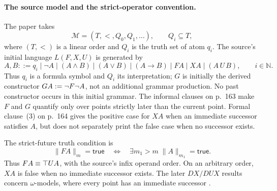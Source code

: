\paragraph{The source model and the strict-operator convention.}
The paper takes
\[
 \mathcal M=(T,<,Q_0,Q_1,\ldots),
 \qquad Q_i\subseteq T,
\]
where \((T,<)\) is a linear order and \(Q_i\) is the truth set of atom
\(q_i\).  The source's initial language \(L(F,X,U)\) is generated by
\[
 A,B::=q_i\mid\neg A\mid(A\land B)\mid(A\lor B)\mid(A\to B)
       \mid FA\mid XA\mid(A\,U\,B),
 \qquad i\in\mathbb N.
\]
Thus \(q_i\) is a formula symbol and \(Q_i\) its interpretation; \(G\) is
initially the derived constructor \(GA\mathrel{:=}\neg F\neg A\), not an additional
grammar production.  No past constructor occurs in this initial grammar.
The informal clauses on p.~163 make \(F\) and \(G\) quantify only
over points strictly later than the current point.  Formal clause~(3) on
p.~164 gives the positive case for \(XA\) when an immediate successor satisfies
\(A\), but does not separately print the false case when no successor exists.

The strict-future truth condition is
\[
 \lVert FA\rVert_m=\mathsf{true}
 \quad\Longleftrightarrow\quad
 \exists m_1>m\;\lVert A\rVert_{m_1}=\mathsf{true}.
\]
Thus \(FA\equiv\top U A\), with the source's infix operand order.
On an arbitrary order, \(XA\) is false when no immediate successor
exists. The later \(DX/DUX\) results concern \(\omega\)-models, where
every point has an immediate successor
\cite[pp.~163--164]{GabbayPnueliShelahStavi1980}.

